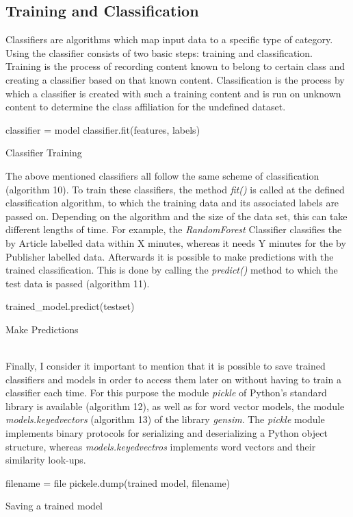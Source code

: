 \documentclass[a4paper, 11pt,titlepage,oneside,openany]{book}
\begin{document}
\subsection{Training and Classification}
Classifiers are algorithms which map input data to a specific type of category. Using the classifier consists of two basic steps: training and classification. Training is the process of recording content known to belong to certain class and creating a classifier based on that known content. Classification is the process by which a classifier is created with such a training content and is run on unknown content to determine the class affiliation for the undefined dataset.
\begin{algorithm}[h]
	\DontPrintSemicolon
	classifier = model\;
	classifier.fit(features, labels)
	\caption{Classifier Training}
\end{algorithm}
The above mentioned classifiers all follow the same scheme of classification (algorithm 10). To train these classifiers, the method \textit{fit()} is called at the defined classification algorithm, to which the training data and its associated labels are passed on. Depending on the algorithm and the size of the data set, this can take different lengths of time.  For example, the \textit{RandomForest} Classifier classifies the by Article labelled data within X minutes, whereas it needs Y minutes for the by Publisher labelled data. 
Afterwards it is possible to make predictions with the trained classification.  This is done by calling the \textit{predict()} method to which the test data is passed (algorithm 11).
\begin{algorithm}[h]
	\DontPrintSemicolon
	trained\_model.predict(testset)
	\caption{Make Predictions}
\end{algorithm}\\
\noindent Finally, I consider it important to mention that it is possible to save trained classifiers and models in order to access them later on without having to train a classifier each time.
For this purpose the module \textit{pickle} of Python's standard library is available (algorithm 12), as well as for word vector models, the module \textit{models.keyedvectors} (algorithm 13) of the library \textit{gensim}. The \textit{pickle} module implements binary protocols for serializing and deserializing a Python object structure, whereas \textit{models.keyedvectros} implements word vectors and their similarity look-ups.
\begin{algorithm}[h]
	\DontPrintSemicolon
	filename = file
	pickele.dump(trained model, filename)
	\caption{Saving a trained model}
\end{algorithm}
\end{document}
